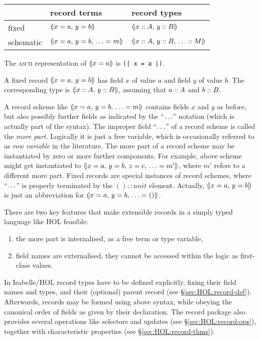 \begin{center}
\begin{tabular}{l|l|l}
  & record terms & record types \\ \hline
  fixed & $\mathopen{(\!|} x = a\mathpunct{,\,} y = b \mathclose{|\!)}$ & $\mathopen{(\!|} x \mathrel{::} A\mathpunct{,\,} y \mathrel{::} B \mathclose{|\!)}$ \\
  schematic & $\mathopen{(\!|} x = a\mathpunct{,\,} y = b\mathpunct{,\,} \ldots = m \mathclose{|\!)}$ &
    $\mathopen{(\!|} x \mathrel{::} A\mathpunct{,\,} y \mathrel{::} B\mathpunct{,\,} \ldots \mathrel{::} M \mathclose{|\!)}$ \\
\end{tabular}
\end{center}

\noindent The \textsc{ascii} representation of $\mathopen{(\!|} x = a \mathclose{|\!)}$ is \texttt{(| x = a |)}.

A fixed record $\mathopen{(\!|} x = a\mathpunct{,\,} y = b \mathclose{|\!)}$ has field $x$ of value $a$ and field
$y$ of value $b$.  The corresponding type is $\mathopen{(\!|} x \mathrel{::} A\mathpunct{,\,} y \mathrel{::} B \mathclose{|\!)}$,
assuming that $a \mathrel{::} A$ and $b \mathrel{::} B$.

A record scheme like $\mathopen{(\!|} x = a\mathpunct{,\,} y = b\mathpunct{,\,} \ldots = m \mathclose{|\!)}$ contains fields
$x$ and $y$ as before, but also possibly further fields as indicated by the
``$\ldots$'' notation (which is actually part of the syntax).  The improper
field ``$\ldots$'' of a record scheme is called the \emph{more part}.
Logically it is just a free variable, which is occasionally referred to as
\emph{row variable} in the literature.  The more part of a record scheme may
be instantiated by zero or more further components.  For example, above scheme
might get instantiated to $\mathopen{(\!|} x = a\mathpunct{,\,} y = b\mathpunct{,\,} z = c\mathpunct{,\,} \ldots = m' \mathclose{|\!)}$,
where $m'$ refers to a different more part.  Fixed records are special
instances of record schemes, where ``$\ldots$'' is properly terminated by the
$() :: unit$ element.  Actually, $\mathopen{(\!|} x = a\mathpunct{,\,} y = b \mathclose{|\!)}$ is just an
abbreviation for $\mathopen{(\!|} x = a\mathpunct{,\,} y = b\mathpunct{,\,} \ldots = () \mathclose{|\!)}$.

\medskip

There are two key features that make extensible records in a simply typed
language like HOL feasible:
\begin{enumerate}
\item the more part is internalised, as a free term or type variable,
\item field names are externalised, they cannot be accessed within the logic
  as first-class values.
\end{enumerate}

\medskip

In Isabelle/HOL record types have to be defined explicitly, fixing their field
names and types, and their (optional) parent record (see
{\S}\ref{sec:HOL:record-def}).  Afterwards, records may be formed using above
syntax, while obeying the canonical order of fields as given by their
declaration.  The record package also provides several operations like
selectors and updates (see {\S}\ref{sec:HOL:record-ops}), together with
characteristic properties (see {\S}\ref{sec:HOL:record-thms}).

